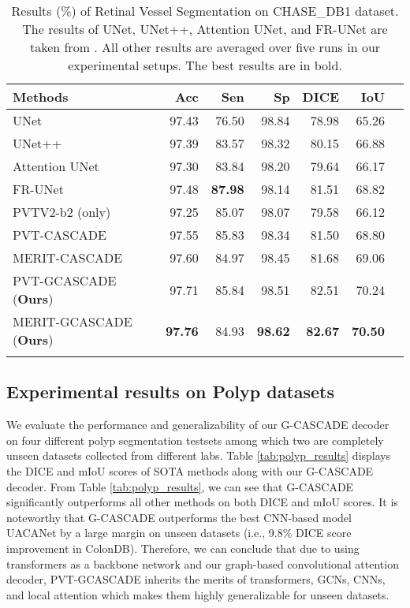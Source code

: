 \documentclass[10pt,twocolumn,letterpaper]{article}
\begin{document}
\begin{table}[t]
\color{black}
\centering 
    {\begin{adjustbox}{width=0.48\textwidth}
{\begin{tabular}{lrrrrrr}
\toprule
Methods      &  Acc & Sen & Sp & DICE & IoU \\
\midrule
UNet \cite{ronneberger2015u}                    &  97.43 &  76.50 & 98.84 & 78.98 &   65.26 \\
UNet++ \cite{zhou2018unet++}                    &  97.39 &  83.57 & 98.32 & 80.15 &   66.88 \\
Attention UNet \cite{oktay2018attention}                    &  97.30 &  83.84 & 98.20 & 79.64 &   66.17 \\
FR-UNet \cite{liu2022full}                   &  97.48 &  \textbf{87.98} & 98.14 & 81.51 &   68.82 \\
PVTV2-b2 (only) \cite{wang2022pvt}                   & 97.25 & 85.07 & 98.07 & 79.58 &  66.12 \\
PVT-CASCADE \cite{Rahman_2023_WACV}                   & 97.55 & 85.83 & 98.34 & 81.50 &  68.80 \\
MERIT-CASCADE \cite{rahman2023multi}                             &  97.60 & 84.97 & 98.45 & 81.68 &   69.06 \\
\midrule 
PVT-GCASCADE (\textbf{Ours})                       & 97.71 & 85.84 & 98.51 & 82.51 & 70.24      \\
MERIT-GCASCADE (\textbf{Ours})             &  \textbf{97.76} & 84.93     & \textbf{98.62} & \textbf{82.67} &    \textbf{70.50} \\
\bottomrule \\
\end{tabular}}
\end{adjustbox}

}\caption{Results (\%) of Retinal Vessel Segmentation on CHASE\_DB1 dataset. The results of UNet, UNet++, Attention UNet, and FR-UNet are taken from \cite{liu2022full}. All other results are averaged over five runs in our experimental setups. The best results are in bold.}
\label{tab:results_chase}
\color{black}
\end{table}

\subsection{Experimental results on Polyp datasets}
We evaluate the performance and generalizability of our G-CASCADE decoder on four different polyp segmentation testsets among which two are completely unseen datasets collected from different labs. Table \ref{tab:polyp_results} displays the DICE and mIoU scores of SOTA methods along with our G-CASCADE decoder. From Table \ref{tab:polyp_results}, we can see that G-CASCADE significantly outperforms all other methods on both DICE and mIoU scores. It is noteworthy that G-CASCADE outperforms the best CNN-based model UACANet by a large margin on unseen datasets (i.e., 9.8\% DICE score improvement in ColonDB). Therefore, we can conclude that due to using transformers as a backbone network and our graph-based convolutional attention decoder, PVT-GCASCADE inherits the merits of transformers, GCNs, CNNs, and local attention which makes them highly generalizable for unseen datasets.
\end{document}

